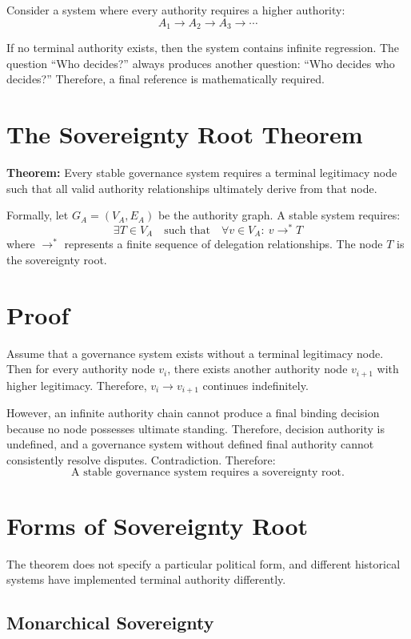 \documentclass[11pt,openany]{book}
\theoremstyle{plain}
\theoremstyle{definition}
\begin{document}
Consider a system where every authority requires a higher authority:
\[
A_1 \longrightarrow A_2 \longrightarrow A_3 \longrightarrow \cdots
\]

If no terminal authority exists, then the system contains infinite regression. The question ``Who decides?'' always produces another question: ``Who decides who decides?'' Therefore, a final reference is mathematically required.

\section*{The Sovereignty Root Theorem}

\textbf{Theorem:} Every stable governance system requires a terminal legitimacy node such that all valid authority relationships ultimately derive from that node.

Formally, let \(G_A = (V_A, E_A)\) be the authority graph. A stable system requires:
\[
\exists T \in V_A \quad \text{such that} \quad \forall v \in V_A: \ v \longrightarrow^* T
\]
where \(\longrightarrow^*\) represents a finite sequence of delegation relationships. The node \(T\) is the sovereignty root.

\section*{Proof}

Assume that a governance system exists without a terminal legitimacy node. Then for every authority node \(v_i\), there exists another authority node \(v_{i+1}\) with higher legitimacy. Therefore, \(v_i \longrightarrow v_{i+1}\) continues indefinitely. 

However, an infinite authority chain cannot produce a final binding decision because no node possesses ultimate standing. Therefore, decision authority is undefined, and a governance system without defined final authority cannot consistently resolve disputes. Contradiction. Therefore:
\[
\boxed{
\text{A stable governance system requires a sovereignty root.}
}
\]

\section*{Forms of Sovereignty Root}

The theorem does not specify a particular political form, and different historical systems have implemented terminal authority differently.

\subsection*{Monarchical Sovereignty}
\end{document}
